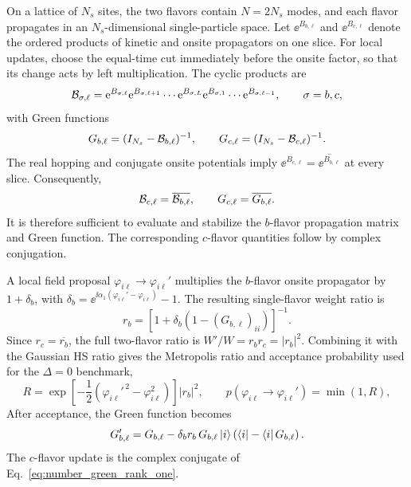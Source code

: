 On a lattice of $N_s$ sites, the two flavors contain $N=2N_s$ modes, and each flavor propagates in an $N_s$-dimensional single-particle space. Let $\ee^{B_{b,\ell}}$ and $\ee^{B_{c,\ell}}$ denote the ordered products of kinetic and onsite propagators on one slice. For local updates, choose the equal-time cut immediately before the onsite factor, so that its change acts by left multiplication. The cyclic products are
\begin{equation}
    \mathcal{B}_{\sigma,\ell}
    =\mathrm{e}^{B_{\sigma,\ell}}\mathrm{e}^{B_{\sigma,\ell+1}}\cdots\mathrm{e}^{B_{\sigma,L}}\mathrm{e}^{B_{\sigma,1}}\cdots\mathrm{e}^{B_{\sigma,\ell-1}},
    \qquad \sigma=b,c,
    \label{eq:number_cyclic_products_benchmark}
\end{equation}
with Green functions
\begin{equation}
    G_{b,\ell}=(I_{N_s}-\mathcal{B}_{b,\ell})^{-1},
    \qquad
    G_{c,\ell}=(I_{N_s}-\mathcal{B}_{c,\ell})^{-1}.
    \label{eq:number_green_bc_def}
\end{equation}
The real hopping and conjugate onsite potentials imply $\ee^{B_{c,\ell}}=\overline{\ee^{B_{b,\ell}}}$ at every slice. Consequently,
\begin{equation}
    \mathcal{B}_{c,\ell}=\overline{\mathcal{B}_{b,\ell}},
    \qquad
    G_{c,\ell}=\overline{G_{b,\ell}}.
    \label{eq:conj_green_benchmark}
\end{equation}
It is therefore sufficient to evaluate and stabilize the $b$-flavor propagation matrix and Green function. The corresponding $c$-flavor quantities follow by complex conjugation.

A local field proposal $\varphi_{i\ell}\to\varphi_{i\ell}'$ multiplies the $b$-flavor onsite propagator by $1+\delta_b$, with $\delta_b=\ee^{\ii\alpha_1(\varphi_{i\ell}'-\varphi_{i\ell})}-1$. The resulting single-flavor weight ratio is
\begin{equation}
    r_b=\left[1+\delta_b(1-(G_{b,\ell})_{ii})\right]^{-1}.
    \label{eq:single_flavor_local_ratio}
\end{equation}
Since $r_c=\overline{r_b}$, the full two-flavor ratio is $W'/W=r_b r_c=|r_b|^2$. Combining it with the Gaussian HS ratio gives the Metropolis ratio and acceptance probability used for the $\Delta=0$ benchmark,
\begin{equation}
    R=\exp\left[-\frac12(\varphi_{i\ell}'^{\,2}-\varphi_{i\ell}^{2})\right]|r_b|^2,
    \qquad
    p(\varphi_{i\ell}\to \varphi_{i\ell}')=\min(1,R),
    \label{eq:benchmark_number_local_ratio}
\end{equation}
After acceptance, the Green function becomes
\begin{equation}
    G_{b,\ell}'=G_{b,\ell}
    -\delta_b r_b\,G_{b,\ell}\ket{i}
    \left(\bra{i}-\bra{i}G_{b,\ell}\right).
    \label{eq:number_green_rank_one}
\end{equation}
The $c$-flavor update is the complex conjugate of Eq.~\eqref{eq:number_green_rank_one}.

